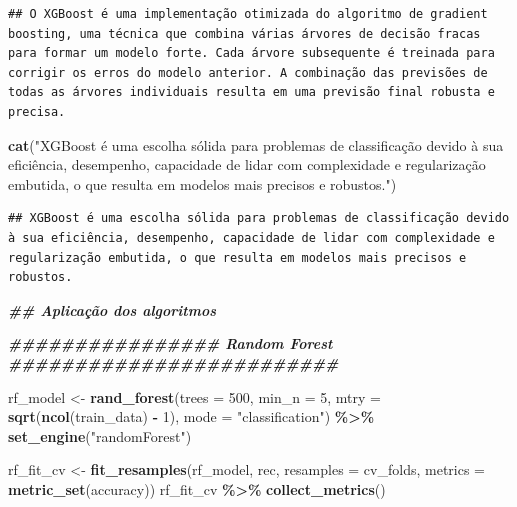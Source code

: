 \documentclass[
]{article}
\newenvironment{Shaded}{\begin{snugshade}}{\end{snugshade}}
\newcommand{\AttributeTok}[1]{\textcolor[rgb]{0.13,0.29,0.53}{#1}}
\newcommand{\DecValTok}[1]{\textcolor[rgb]{0.00,0.00,0.81}{#1}}
\newcommand{\DocumentationTok}[1]{\textcolor[rgb]{0.56,0.35,0.01}{\textbf{\textit{#1}}}}
\newcommand{\FunctionTok}[1]{\textcolor[rgb]{0.13,0.29,0.53}{\textbf{#1}}}
\newcommand{\NormalTok}[1]{#1}
\newcommand{\OtherTok}[1]{\textcolor[rgb]{0.56,0.35,0.01}{#1}}
\newcommand{\SpecialCharTok}[1]{\textcolor[rgb]{0.81,0.36,0.00}{\textbf{#1}}}
\newcommand{\StringTok}[1]{\textcolor[rgb]{0.31,0.60,0.02}{#1}}
\begin{document}
\begin{verbatim}
## O XGBoost é uma implementação otimizada do algoritmo de gradient boosting, uma técnica que combina várias árvores de decisão fracas para formar um modelo forte. Cada árvore subsequente é treinada para corrigir os erros do modelo anterior. A combinação das previsões de todas as árvores individuais resulta em uma previsão final robusta e precisa.
\end{verbatim}

\begin{Shaded}
\begin{Highlighting}[]
\FunctionTok{cat}\NormalTok{(}\StringTok{"XGBoost é uma escolha sólida para problemas de classificação devido à sua eficiência, desempenho, capacidade de lidar com complexidade e regularização embutida, o que resulta em modelos mais precisos e robustos."}\NormalTok{)}
\end{Highlighting}
\end{Shaded}

\begin{verbatim}
## XGBoost é uma escolha sólida para problemas de classificação devido à sua eficiência, desempenho, capacidade de lidar com complexidade e regularização embutida, o que resulta em modelos mais precisos e robustos.
\end{verbatim}

\begin{Shaded}
\begin{Highlighting}[]
\DocumentationTok{\#\# Aplicação dos algoritmos}

\DocumentationTok{\#\#\#\#\#\#\#\#\#\#\#\#\#\#\#\# Random Forest \#\#\#\#\#\#\#\#\#\#\#\#\#\#\#\#\#\#\#\#\#\#\#\#\#}

\NormalTok{rf\_model }\OtherTok{\textless{}{-}} \FunctionTok{rand\_forest}\NormalTok{(}\AttributeTok{trees =} \DecValTok{500}\NormalTok{,}
                        \AttributeTok{min\_n =} \DecValTok{5}\NormalTok{, }
                        \AttributeTok{mtry =} \FunctionTok{sqrt}\NormalTok{(}\FunctionTok{ncol}\NormalTok{(train\_data) }\SpecialCharTok{{-}} \DecValTok{1}\NormalTok{), }
                        \AttributeTok{mode =} \StringTok{"classification"}\NormalTok{) }\SpecialCharTok{\%\textgreater{}\%}
  \FunctionTok{set\_engine}\NormalTok{(}\StringTok{"randomForest"}\NormalTok{)}


\NormalTok{rf\_fit\_cv }\OtherTok{\textless{}{-}} \FunctionTok{fit\_resamples}\NormalTok{(rf\_model, rec, }\AttributeTok{resamples =}\NormalTok{ cv\_folds, }\AttributeTok{metrics =} \FunctionTok{metric\_set}\NormalTok{(accuracy))}
\NormalTok{rf\_fit\_cv }\SpecialCharTok{\%\textgreater{}\%} \FunctionTok{collect\_metrics}\NormalTok{()}
\end{Highlighting}
\end{Shaded}
\end{document}
